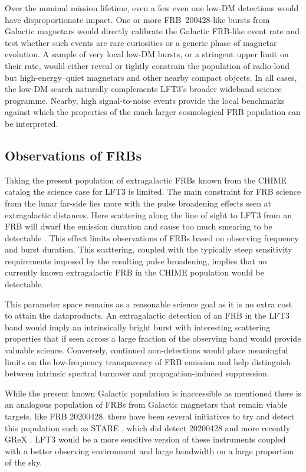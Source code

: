 Over the nominal mission lifetime, even a few even one low-DM detections would have disproportionate impact. One or more FRB~200428-like bursts from Galactic magnetars would directly calibrate the Galactic FRB-like event rate and test whether such events are rare curiosities or a generic phase of magnetar evolution. A sample of very local low-DM bursts, or a stringent upper limit on their rate, would either reveal or tightly constrain the population of radio-loud but high-energy–quiet magnetars and other nearby compact objects. In all cases, the low-DM search naturally complements LFT3's broader wideband science programme. Nearby, high signal-to-noise events provide the local benchmarks against which the properties of the much larger cosmological FRB population can be interpreted.

\subsection{Observations of FRBs}

Taking the present population of extragalactic FRBs known from the CHIME catalog \citep{collaboration_first_2021} the science case for LFT3 is limited. The main constraint for FRB science from the lunar far-side lies more with the pulse broadening effects seen at extragalactic distances. Here scattering  along the line of sight to LFT3 from an FRB will dwarf the emission duration and cause too much smearing to be detectable \citep{bhat_clean-based_2003}. This effect limits observations of FRBs based on observing frequency and burst duration. This scattering, coupled with the typically steep sensitivity requirements imposed by the resulting pulse broadening, implies that no currently known extragalactic FRB in the CHIME population would be detectable. 

This parameter space remains as a reasonable science goal as it is no extra cost to attain the dataproducts. An extragalactic detection of an FRB in the LFT3 band would imply an intrinsically bright burst with interesting scattering properties that if seen across a large fraction of the observing band would provide valuable science. Conversely, continued non-detections would place meaningful limits on the low-frequency transparency of FRB emission and help distinguish between intrinsic spectral turnover and propagation-induced suppression.

While the present known Galactic population is inaccessible as mentioned there is an analogous population of FRBs from Galactic magnetars that remain viable targets, like FRB 20200428. there have been several initiatives to try and detect this population such as STARE \citep{bochenek_stare2_2020}, which did detect 20200428 and more recently GReX \citep{shila_grex_2025}. LFT3 would be a more sensitive version of these instruments coupled with a better observing environment and large bandwidth on a large proportion of the sky. 

